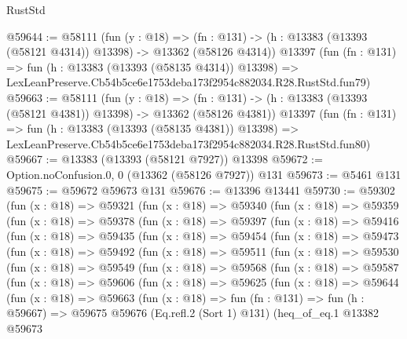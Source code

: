 \begin{lexlean}{RustStd}
\begin{coremodule}
@59644 := @58111
    (fun (y : @18) =>
    (fn : @131) -> (h : @13383 (@13393 (@58121 @4314)) @13398) -> @13362 (@58126 @4314))
    @13397
    (fun (fn : @131) =>
    fun (h : @13383 (@13393 (@58135 @4314)) @13398) =>
    LexLeanPreserve.Cb54b5ce6e1753deba173f2954c882034.R28.RustStd.fun79)
@59663 := @58111
    (fun (y : @18) =>
    (fn : @131) -> (h : @13383 (@13393 (@58121 @4381)) @13398) -> @13362 (@58126 @4381))
    @13397
    (fun (fn : @131) =>
    fun (h : @13383 (@13393 (@58135 @4381)) @13398) =>
    LexLeanPreserve.Cb54b5ce6e1753deba173f2954c882034.R28.RustStd.fun80)
@59667 := @13383 (@13393 (@58121 @7927)) @13398
@59672 := Option.noConfusion.{0, 0} (@13362 (@58126 @7927)) @131
@59673 := @5461 @131
@59675 := @59672 @59673 @131
@59676 := @13396 @13441
@59730 := @59302
    (fun (x : @18) =>
    @59321
      (fun (x : @18) =>
      @59340
        (fun (x : @18) =>
        @59359
          (fun (x : @18) =>
          @59378
            (fun (x : @18) =>
            @59397
              (fun (x : @18) =>
              @59416
                (fun (x : @18) =>
                @59435
                  (fun (x : @18) =>
                  @59454
                    (fun (x : @18) =>
                    @59473
                      (fun (x : @18) =>
                      @59492
                        (fun (x : @18) =>
                        @59511
                          (fun (x : @18) =>
                          @59530
                            (fun (x : @18) =>
                            @59549
                              (fun (x : @18) =>
                              @59568
                                (fun (x : @18) =>
                                @59587
                                  (fun (x : @18) =>
                                  @59606
                                    (fun (x : @18) =>
                                    @59625
                                      (fun (x : @18) =>
                                      @59644
                                        (fun (x : @18) =>
                                        @59663
                                          (fun (x : @18) =>
                                          fun (fn : @131) =>
                                          fun (h : @59667) =>
                                          @59675
                                            @59676
                                            (Eq.refl.{2} (Sort 1) @131)
                                            (heq_of_eq.{1}
                                              @13382
                                              @59673

\end{coremodule}
\end{lexlean}
